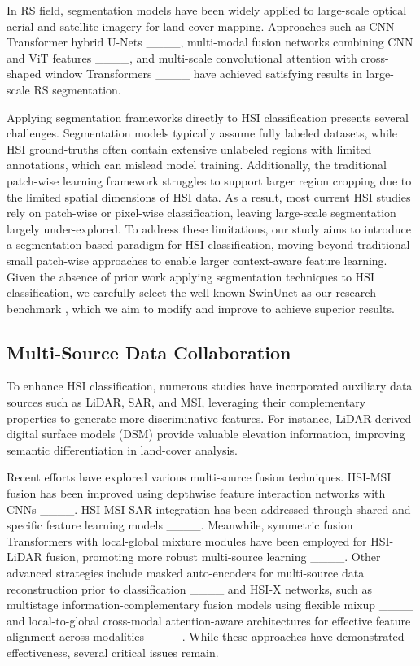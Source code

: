 In RS field, segmentation models have been widely applied to large-scale optical aerial and satellite imagery for land-cover mapping. Approaches such as CNN-Transformer hybrid U-Nets ____, multi-modal fusion networks combining CNN and ViT features ____, and multi-scale convolutional attention with cross-shaped window Transformers ____ have achieved satisfying results in large-scale RS segmentation.

Applying segmentation frameworks directly to HSI classification presents several challenges. Segmentation models typically assume fully labeled datasets, while HSI ground-truths often contain extensive unlabeled regions with limited annotations, which can mislead model training. Additionally, the traditional patch-wise learning framework struggles to support larger region cropping due to the limited spatial dimensions of HSI data. As a result, most current HSI studies rely on patch-wise or pixel-wise classification, leaving large-scale segmentation largely under-explored. To address these limitations, our study aims to introduce a segmentation-based paradigm for HSI classification, moving beyond traditional small patch-wise approaches to enable larger context-aware feature learning. Given the absence of prior work applying segmentation techniques to HSI classification, we carefully select the well-known SwinUnet as our research benchmark , which we aim to modify and improve to achieve superior results.


\subsection{Multi-Source Data Collaboration}
To enhance HSI classification, numerous studies have incorporated auxiliary data sources such as LiDAR, SAR, and MSI, leveraging their complementary properties to generate more discriminative features. For instance, LiDAR-derived digital surface models (DSM) provide valuable elevation information, improving semantic differentiation in land-cover analysis.

Recent efforts have explored various multi-source fusion techniques. HSI-MSI fusion has been improved using depthwise feature interaction networks with CNNs  ____. HSI-MSI-SAR integration has been addressed through shared and specific feature learning models ____. Meanwhile, symmetric fusion Transformers with local-global mixture modules have been employed for HSI-LiDAR fusion, promoting more robust multi-source learning ____. Other advanced strategies include masked auto-encoders for multi-source data reconstruction prior to classification ____ and HSI-X networks, such as multistage information-complementary fusion models using flexible mixup ____ and local-to-global cross-modal attention-aware architectures for effective feature alignment across modalities ____. While these approaches have demonstrated effectiveness, several critical issues remain.


